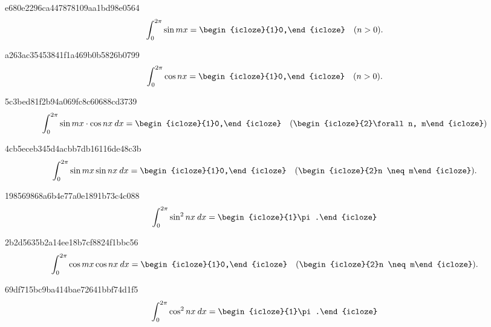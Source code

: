 \begin{note}{e680e2296ca447878109aa1bd98e0564}
    \[
        \int_{0}^{2\pi} \sin mx = \begin{icloze}{1}0,\end{icloze} \quad (n > 0).
    \]
\end{note}

\begin{note}{a263ac35453841f1a469b0b5826b0799}
    \[
        \int_{0}^{2\pi} \cos nx = \begin{icloze}{1}0,\end{icloze} \quad (n > 0).
    \]
\end{note}

\begin{note}{5c3bed81f2b94a069fc8c60688cd3739}
    \[
        \int_{0}^{2\pi} \sin mx \cdot \cos nx\: dx = \begin{icloze}{1}0,\end{icloze} \quad (\begin{icloze}{2}\forall n, m\end{icloze})
    \]
\end{note}

\begin{note}{4cb5eceb345d4acbb7db16116de48c3b}
    \[
        \int_{0}^{2\pi} \sin mx \sin nx\: dx = \begin{icloze}{1}0,\end{icloze} \quad (\begin{icloze}{2}n \neq m\end{icloze}).
    \]
\end{note}

\begin{note}{198569868a6b4e77a0e1891b73c4c088}
    \[
        \int_{0}^{2\pi} \sin^2 nx \: dx = \begin{icloze}{1}\pi.\end{icloze}
    \]
\end{note}

\begin{note}{2b2d5635b2a14ee18b7cf8824f1bbc56}
    \[
        \int_{0}^{2\pi} \cos mx \cos nx\: dx = \begin{icloze}{1}0,\end{icloze} \quad (\begin{icloze}{2}n \neq m\end{icloze}).
    \]
\end{note}

\begin{note}{69df715bc9ba414bae72641bbf74d1f5}
    \[
        \int_{0}^{2\pi} \cos^2 nx \: dx = \begin{icloze}{1}\pi.\end{icloze}
    \]
\end{note}

